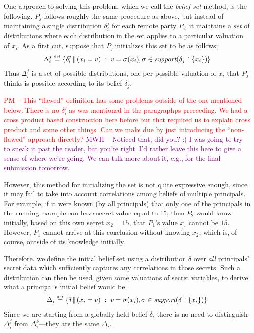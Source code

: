 \documentclass[10pt]{sigplanconf}
\newcommand{\mwh}[1]{\textcolor{purple}{MWH -- #1}}
\newcommand{\pxm}[1]{\textcolor{red}{PM -- #1}}
\newcommand{\mwh}[1]{}
\newcommand{\pxm}[1]{}
\begin{document}
One approach to solving this problem, which we call the \emph{belief
  set} method, is the following.
$P_j$ follows roughly the same procedure as above, but instead of
maintaining a single distribution $\delta_i^j$ for each remote party
$P_i$, it maintains a \emph{set} of distributions where each
distribution in the set applies to a particular valuation of $x_i$.
As a first cut, suppose that $P_j$ initializes this set to be as
follows:
$$
\Delta_i^j \stackrel{\smash{\scriptscriptstyle \mathrm{def}}}= \{\delta^j_i\!\parallel\!{(x_i = v)} \;:\; v = \sigma(x_i),
\sigma \in \textit{support}(\delta_j \upharpoonright \{x_i\})\}
$$
Thus $\Delta_i^j$ is a set of
possible distributions, one per possible valuation of $x_i$ that $P_j$ thinks
is possible according to its belief $\delta_j$.

\pxm{This ``flawed'' definition has some problems outside of the one
mentioned below. There is no $ \delta^j_i $ as was mentioned in the
paragraphps preceeding. We had a cross product based construction here
before but that required us to explain cross product and some other
things. Can we make due by just introducing the ``non-flawed''
approach directly?}
\mwh{Noticed that, did you? :)  I was going to try to sneak it past
  the reader, but you're right.  I'd rather leave this here to give a
  sense of where we're going.  We can talk more about it, e.g., for
  the final submission tomorrow.}

However, this method for initializing the set is not quite expressive
enough, since it may fail to take into account correlations among
beliefs of multiple principals.  For example, if it were known (by all
principals) that only one of the principals in the running example can
have secret value equal to 15, then $ P_2 $ would know initially,
based on this own secret $ x_2 = 15 $, that $ P_1 $'s value $ x_1 $
cannot be $ 15 $. However, $ P_1 $ cannot arrive at this conclusion
without knowing $ x_2 $, which is, of course, outside of its knowledge
initially.

Therefore, we define the initial belief set using a distribution $
\delta $ over \emph{all} principals' secret data which sufficiently
captures any correlations in those secrets. Such a distribution can
then be used, given some valuations of secret variables, to derive
what a principal's initial belief would be.
$$
\Delta_i \stackrel{\smash{\scriptscriptstyle \mathrm{def}}}= \{\delta\!\parallel\!{(x_i = v)} \;:\; v = \sigma(x_i), \sigma \in \textit{support}(\delta \upharpoonright \{x_i\}) \}
$$
Since we are starting from a globally held belief $\delta$, there is
no need to distinguish $\Delta_i^j$ from $\Delta_i^k$---they
are the same $\Delta_i$.
\end{document}
